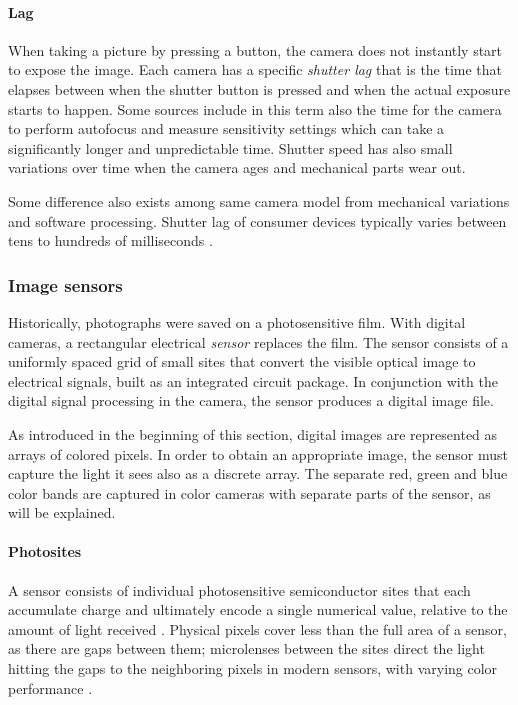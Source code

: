 

\paragraph{Lag}
When taking a picture by pressing a button, the camera does not instantly start to expose the image.
Each camera has a specific \emph{shutter lag} that is the time that elapses between when the shutter button is pressed and when the actual exposure starts to happen.
Some sources include in this term also the time for the camera to perform autofocus and measure sensitivity settings which can take a significantly longer and unpredictable time.
Shutter speed has also small variations over time when the camera ages and mechanical parts wear out.

Some difference also exists among same camera model from mechanical variations and software processing.
Shutter lag of consumer devices typically varies between tens to hundreds of milliseconds \cite{hasshutterlag}.

\subsubsection{Image sensors} \label{sec:sensors} %


Historically, photographs were saved on a photosensitive film.
With digital cameras, a rectangular electrical \emph{sensor} replaces the film.
The sensor consists of a uniformly spaced grid of small sites that convert the visible optical image to electrical signals, built as an integrated circuit package.
In conjunction with the digital signal processing in the camera, the sensor produces a digital image file.


As introduced in the beginning of this section, digital images are represented as arrays of colored pixels.
In order to obtain an appropriate image, the sensor must capture the light it sees also as a discrete array.
The separate red, green and blue color bands are captured in color cameras with separate parts of the sensor, as will be explained.

\paragraph{Photosites}
A sensor consists of individual photosensitive semiconductor sites that each accumulate charge and ultimately encode a single numerical value, relative to the amount of light received \cite[ch. 3]{nakamura2005image}.
Physical pixels cover less than the full area of a sensor, as there are gaps between them;
microlenses between the sites direct the light hitting the gaps to the neighboring pixels in modern sensors, with varying color performance \cite[p. 64]{nakamura2005image} \cite{el2005cmos}.

